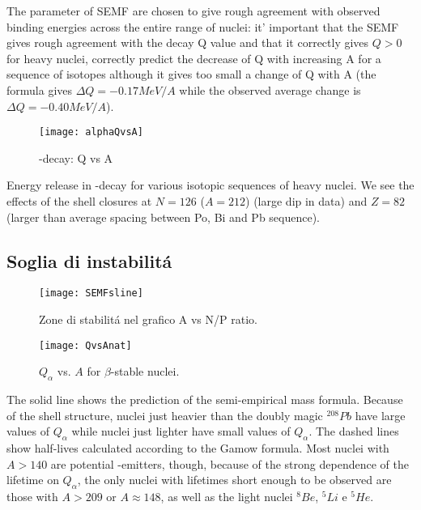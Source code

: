 The parameter of SEMF are chosen to give rough agreement with observed binding energies across the entire range of nuclei: it' important that the SEMF gives rough agreement with the decay Q value and that it correctly gives $Q>0$ for heavy nuclei, correctly predict the decrease of Q with increasing A for a sequence of isotopes although it gives too small a change of Q with A (the formula gives $\Delta Q=-0.17 MeV/A$ while the observed average change is $\Delta Q=-0.40 MeV/A$).

 \begin{figure}[!ht]
\centering
\texttt{[image: alphaQvsA]}
\caption{\Ra-decay: Q vs A}
\label{fig:alphaQvsA}
\end{figure}

Energy release in \Ra-decay for various isotopic sequences of heavy nuclei. We see the effects of the shell closures at $N=126$ ($A=212$) (large dip in data) and $Z=82$ (larger than average spacing between Po, Bi and Pb sequence).


\subsection{Soglia di instabilit\'a}
 
\begin{figure}[!ht]
\centering
\texttt{[image: SEMFsline]}
\caption{Zone di stabilit\'a nel grafico A vs N/P ratio.}
\label{fig:SEMFsline}
\end{figure}

 \begin{figure}[!ht]
\centering
\texttt{[image: QvsAnat]}
\caption{$Q_{\alpha}$ vs. $A$ for $\beta$-stable nuclei.}
\end{figure}


The solid line shows the prediction of the semi-empirical mass formula. Because of the shell structure, nuclei just heavier than the doubly magic $^{208}Pb$ have large values of $Q_{\alpha}$ while nuclei just lighter have small values of  $Q_{\alpha}$. The dashed lines show half-lives calculated according to the Gamow formula. Most nuclei with $A>140$ are potential \Ra-emitters, though, because of the strong dependence of the lifetime on $Q_{\alpha}$, the only nuclei with lifetimes short enough to be observed are those with $A>209$ or  $A\approx148$, as well as the light nuclei $^8Be$, $^5Li$ e $^5He$.

